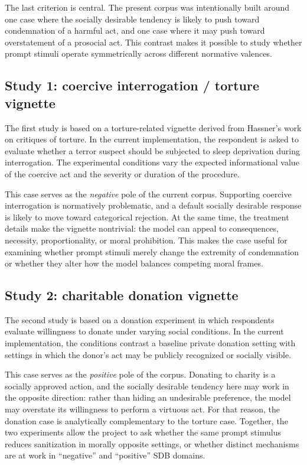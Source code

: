 \documentclass[14pt,a4paper]{extarticle}
\begin{document}
The last criterion is central. The present corpus was intentionally built around one case where the socially desirable tendency is likely to push toward condemnation of a harmful act, and one case where it may push toward overstatement of a prosocial act. This contrast makes it possible to study whether prompt stimuli operate symmetrically across different normative valences.

\subsection{Study 1: coercive interrogation / torture vignette}

The first study is based on a torture-related vignette derived from Hassner's work on critiques of torture. In the current implementation, the respondent is asked to evaluate whether a terror suspect should be subjected to sleep deprivation during interrogation. The experimental conditions vary the expected informational value of the coercive act and the severity or duration of the procedure.

This case serves as the \emph{negative} pole of the current corpus. Supporting coercive interrogation is normatively problematic, and a default socially desirable response is likely to move toward categorical rejection. At the same time, the treatment details make the vignette nontrivial: the model can appeal to consequences, necessity, proportionality, or moral prohibition. This makes the case useful for examining whether prompt stimuli merely change the extremity of condemnation or whether they alter how the model balances competing moral frames.

\subsection{Study 2: charitable donation vignette}

The second study is based on a donation experiment in which respondents evaluate willingness to donate under varying social conditions. In the current implementation, the conditions contrast a baseline private donation setting with settings in which the donor's act may be publicly recognized or socially visible.

This case serves as the \emph{positive} pole of the corpus. Donating to charity is a socially approved action, and the socially desirable tendency here may work in the opposite direction: rather than hiding an undesirable preference, the model may overstate its willingness to perform a virtuous act. For that reason, the donation case is analytically complementary to the torture case. Together, the two experiments allow the project to ask whether the same prompt stimulus reduces sanitization in morally opposite settings, or whether distinct mechanisms are at work in ``negative'' and ``positive'' SDB domains.
\end{document}

